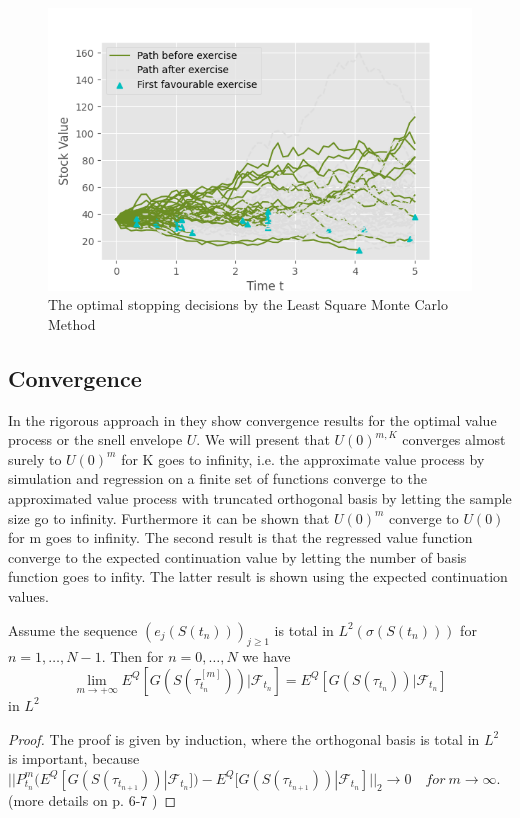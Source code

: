 \begin{figure}[th]
\centering
\includegraphics{Figures/LSMFit2.png}
\decoRule
\caption[Optimal Stopping Decision]{The optimal stopping decisions by the Least Square Monte Carlo Method}
\label{fig:LSM2}
\end{figure}


\subsection{Convergence}
In the rigorous approach in \parencite{analysislsm} they show convergence results for the optimal value process or the snell envelope $U$. We will present that $U(0)^{m,K}$ converges almost surely to $U(0)^{m}$ for K goes to infinity, i.e. the approximate value process by simulation and regression on a finite set of functions converge to the approximated value process with truncated orthogonal basis by letting the sample size go to infinity. Furthermore it can be shown that $U(0)^{m}$ converge to $U(0)$ for m goes to infinity. The second result is that the regressed value function converge to the expected continuation value by letting the number of basis function goes to infity. The latter result is shown using the expected continuation values.
\begin{theorem}\label{LSMConvergence1}
Assume the sequence $(e_{j}(S(t_n)))_{j\geq 1}$ is total in $L^2(\sigma(S(t_n)))$ for $n=1,\ldots,N-1$. Then for $n=0,\ldots,N$ we have
$$\lim_{m\to +\infty} E^Q[G(S(\tau_{t_n}^{[m]})) |\mathcal{F}_{t_n}]=E^Q[G(S(\tau_{t_n})) |\mathcal{F}_{t_n}]$$
in $L^2$
\begin{proof}
The proof is given by induction, where the orthogonal basis is total in $L^2$ is important, because $||P^m_{t_n}(E^Q[G(S(\tau_{t_{n+1}}))|\mathcal{F}_{t_n}])- E^Q[G(S(\tau_{t_{n+1}}))|\mathcal{F}_{t_n}]||_2 \to 0 \quad for \ m \to \infty$.
(more details on p. 6-7 \parencite{analysislsm})
\end{proof}
\end{theorem}

